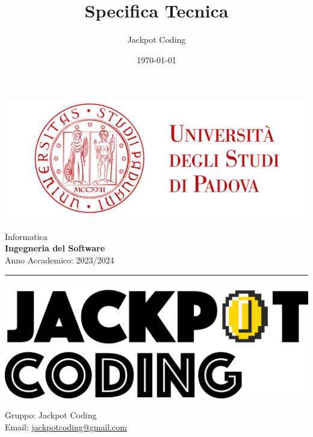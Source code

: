\documentclass[5pt]{article}
\title{Specifica Tecnica}
\author{Jackpot Coding}
\date{\today}
\begin{document}
	
	
	
	\vspace{8pt}
		\includegraphics[scale=0.2]{UNIPDFull.png}
	
	\vspace{30pt}
	
	\begin{minipage}[t]{0.48\textwidth}
		\begin{flushleft}
			Informatica\\
			\vspace{5pt}
			\textbf{\LARGE Ingegneria del Software}\\
			Anno Accademico: 2023/2024
		\end{flushleft}
	\end{minipage}
	
	
	\vspace{5px}
	
	
	\rule{\textwidth}{5pt}
	
	\begin{minipage}[t]{0.50\textwidth}
		\begin{flushleft}
			\hspace{10pt}
				\includegraphics[scale=0.65]{jackpot-logo.png} 
		\end{flushleft}
	\end{minipage}
	\hspace{-60pt} %
	\begin{flushright}
		\begin{minipage}[t]{0.50\textwidth}
			\begin{flushright}
				Gruppo: {\Large Jackpot Coding}\\
				Email: \href{mailto:jackpotcoding@gmail.com}{jackpotcoding@gmail.com}
			\end{flushright}
		\end{minipage}
	\end{flushright}
	
\end{document}
